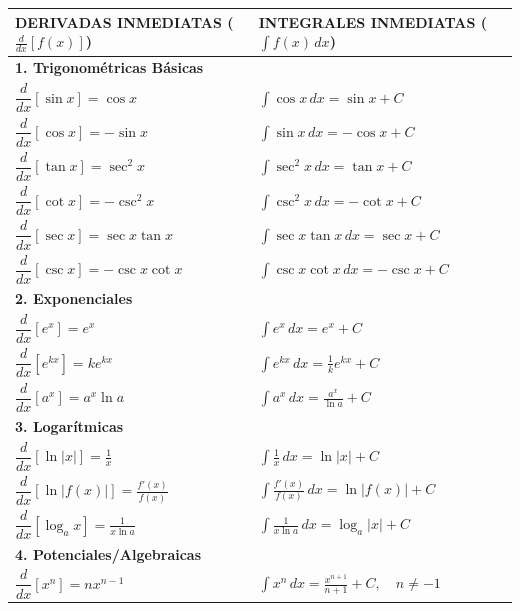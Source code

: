\documentclass{article}
\newcommand{\deriv}[2]{\frac{d#1}{d#2}}
\newcommand{\integral}[2]{\int #1 \, d#2}
\begin{document}
\begin{center}
\footnotesize %
\setlength{\tabcolsep}{4pt} %
\begin{tabular}{|p{}|p{}|}
\toprule
\textbf{DERIVADAS INMEDIATAS} ($\deriv{}{x}[f(x)]$) & \textbf{INTEGRALES INMEDIATAS} ($\integral{f(x)}{x}$) \\
\midrule
\multicolumn{2}{|l|}{\textbf{1. Trigonométricas Básicas}} \\
\midrule
$\dfrac{d}{dx}[\sin x] = \cos x$ & $\displaystyle\int \cos x \, dx = \sin x + C$ \\
$\dfrac{d}{dx}[\cos x] = -\sin x$ & $\displaystyle\int \sin x \, dx = -\cos x + C$ \\
$\dfrac{d}{dx}[\tan x] = \sec^2 x$ & $\displaystyle\int \sec^2 x \, dx = \tan x + C$ \\
$\dfrac{d}{dx}[\cot x] = -\csc^2 x$ & $\displaystyle\int \csc^2 x \, dx = -\cot x + C$ \\
$\dfrac{d}{dx}[\sec x] = \sec x \tan x$ & $\displaystyle\int \sec x \tan x \, dx = \sec x + C$ \\
$\dfrac{d}{dx}[\csc x] = -\csc x \cot x$ & $\displaystyle\int \csc x \cot x \, dx = -\csc x + C$ \\
\midrule
\multicolumn{2}{|l|}{\textbf{2. Exponenciales}} \\
\midrule
$\dfrac{d}{dx}[e^x] = e^x$ & $\displaystyle\int e^x \, dx = e^x + C$ \\
$\dfrac{d}{dx}[e^{kx}] = ke^{kx}$ & $\displaystyle\int e^{kx} \, dx = \frac{1}{k}e^{kx} + C$ \\
$\dfrac{d}{dx}[a^x] = a^x \ln a$ & $\displaystyle\int a^x \, dx = \frac{a^x}{\ln a} + C$ \\
\midrule
\multicolumn{2}{|l|}{\textbf{3. Logarítmicas}} \\
\midrule
$\dfrac{d}{dx}[\ln|x|] = \frac{1}{x}$ & $\displaystyle\int \frac{1}{x} \, dx = \ln|x| + C$ \\
$\dfrac{d}{dx}[\ln|f(x)|] = \frac{f'(x)}{f(x)}$ & $\displaystyle\int \frac{f'(x)}{f(x)} \, dx = \ln|f(x)| + C$ \\
$\dfrac{d}{dx}[\log_a x] = \frac{1}{x \ln a}$ & $\displaystyle\int \frac{1}{x \ln a} \, dx = \log_a |x| + C$ \\
\midrule
\multicolumn{2}{|l|}{\textbf{4. Potenciales/Algebraicas}} \\
\midrule
$\dfrac{d}{dx}[x^n] = nx^{n-1}$ & $\displaystyle\int x^n \, dx = \frac{x^{n+1}}{n+1} + C, \quad n \neq -1$ \\

\end{tabular}
\end{center}
\end{document}
